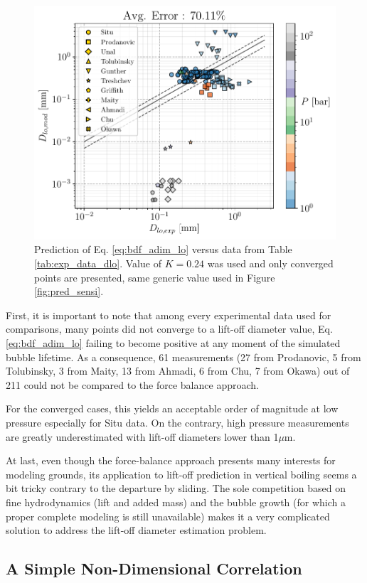 \begin{figure}[!h]
\centering
\includegraphics[width=0.75\linewidth]{img/bub_dyn/lift-off/pred_bdf.pdf}
\caption{Prediction of Eq. \ref{eq:bdf_adim_lo} versus data from Table \ref{tab:exp_data_dlo}. Value of $K=0.24$ was used and only converged points are presented, same generic value used in Figure \ref{fig:pred_sensi}.}
\label{fig:pred_bdf_dlo}
\end{figure}
\npar

First, it is important to note that among every experimental data used for comparisons, many points did not converge to a lift-off diameter value, Eq. \ref{eq:bdf_adim_lo} failing to become positive at any moment of the simulated bubble lifetime. As a consequence, 61 measurements (27 from Prodanovic, 5 from Tolubinsky, 3 from Maity, 13 from Ahmadi, 6 from Chu, 7 from Okawa) out of 211 could not be compared to the force balance approach.

For the converged cases, this yields an acceptable order of magnitude at low pressure especially for Situ data. On the contrary, high pressure measurements are greatly underestimated with lift-off diameters lower than 1$\mu$m.

\npar

At last, even though the force-balance approach presents many interests for modeling grounds, its application to lift-off prediction in vertical boiling seems a bit tricky contrary to the departure by sliding. The sole competition based on fine hydrodynamics (lift and added mass) and the bubble growth (for which a proper complete modeling is still unavailable) makes it a very complicated solution to address the lift-off diameter estimation problem. 


\subsection{A Simple Non-Dimensional Correlation}



